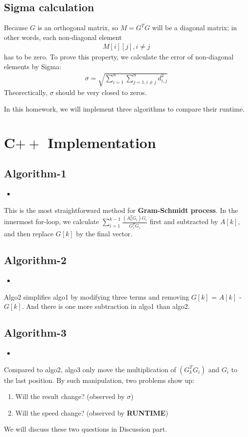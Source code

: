\documentclass{article}
\newcommand{\cppscript}[2]{
    \begin{itemize}
        \item[]
    \end{itemize}
}
\begin{document}
\subsection{Sigma calculation}
Because $G$ is an orthogonal matrix, so $M = G^TG$ will be a diagonal matrix; in other words, each non-diagonal element \newline
\begin{gather}
    M[i][j], i \neq j
\end{gather}
has to be zero. To prove this property, we calculate the error of non-diagonal elements by Sigma: \newline
\begin{gather}
    \sigma = \sqrt{\sum_{i=1}^{n}\sum_{j=1,i \neq j}^{n}d_{i,j}^2}
\end{gather}
Theorectically, $\sigma$ should be very closed to zeros. \newline \newline

In this homework, we will implement three algorithms to compare their runtime.
\newpage

\section{C$++$ Implementation}
\subsection{Algorithm-1}
\cppscript{src/algo1.cpp}{algo1 implementation}
This is the most straightforward method for \textbf{Gram-Schmidt process}. In the innermost for-loop, we calculate
$\sum_{i=1}^{k-1}{\frac{(A_k^TG_i)G_i}{G_i^TG_i}}$ first and subtracted by $A[k]$, and then replace $G[k]$ by the final vector. \newline

\subsection{Algorithm-2}
\cppscript{src/algo2.cpp}{algo2 implementation}
Algo2 simplifies algo1 by modifying three terms and removing $G[k]$ = $A[k]$ - $G[k]$. And there is one more subtraction in algo1 
than algo2.

\subsection{Algorithm-3}
\cppscript{src/algo3.cpp}{algo3 implementation}
\newpage
Compared to algo2, algo3 only move the multiplication of $(G_k^TG_i)$ and $G_i$ to the last position. By such manipulation, two problems
show up:
\begin{enumerate}
    \item Will the result change? (observed by \boldmath$\sigma$) \\
    \item Will the speed change? (observed by \textbf{RUNTIME})
\end{enumerate}
We will discuss these two questions in Discussion part.
\end{document}
